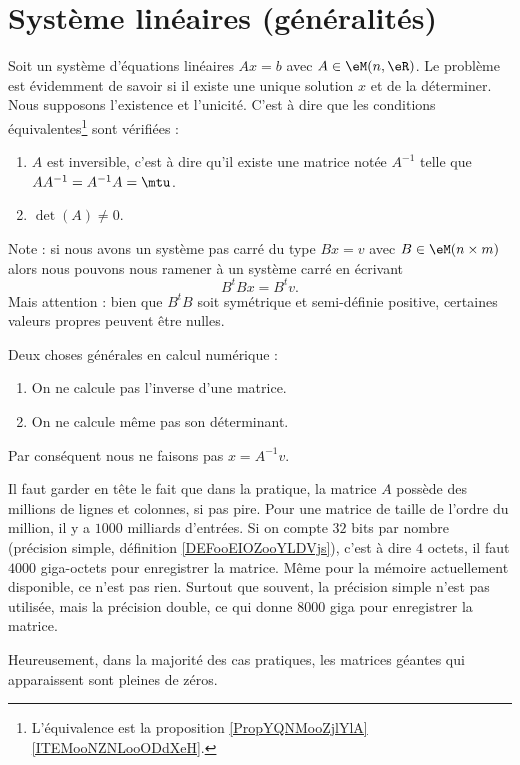 

\section{Système linéaires (généralités)}

Soit un système d'équations linéaires \( Ax=b\) avec \( A\in \eM(n,\eR)\). Le problème est évidemment de savoir si il existe une unique solution \( x\) et de la déterminer. Nous supposons l'existence et l'unicité. C'est à dire que les conditions équivalentes\footnote{L'équivalence est la proposition \ref{PropYQNMooZjlYlA}\ref{ITEMooNZNLooODdXeH}.} sont vérifiées :
\begin{enumerate}
    \item
        \( A\) est inversible, c'est à dire qu'il existe une matrice notée \( A^{-1}\) telle que \( AA^{-1}=A^{-1}A=\mtu\).
    \item
        \( \det(A)\neq 0\).
\end{enumerate}
Note : si  nous avons un système pas carré du type \( Bx=v\) avec \( B\in \eM(n\times m)\) alors nous pouvons nous ramener à un système carré en écrivant
\begin{equation}
    B^tBx=B^tv.
\end{equation}
Mais attention : bien que \( B^tB\) soit symétrique et semi-définie positive, certaines valeurs propres peuvent être nulles.

\begin{normaltext}
    Deux choses générales en calcul numérique :
    \begin{enumerate}
        \item
            On ne calcule pas l'inverse d'une matrice.
        \item
            On ne calcule même pas son déterminant.
    \end{enumerate}
    Par conséquent nous ne faisons pas \( x=A^{-1}v\).

    Il faut garder en tête le fait que dans la pratique, la matrice \( A\) possède des millions de lignes et colonnes, si pas pire. Pour une matrice de taille de l'ordre du million, il y a \( 1000\) milliards d'entrées. Si on compte \( 32\) bits par nombre (précision simple, définition \ref{DEFooEIOZooYLDVjs}), c'est à dire \( 4\) octets, il faut \( 4000\) giga-octets pour enregistrer la matrice. Même pour la mémoire actuellement disponible, ce n'est pas rien. Surtout que souvent, la précision simple n'est pas utilisée, mais la précision double, ce qui donne \( 8000\) giga pour enregistrer la matrice.

    Heureusement, dans la majorité des cas pratiques, les matrices géantes qui apparaissent sont pleines de zéros.

\end{normaltext}

